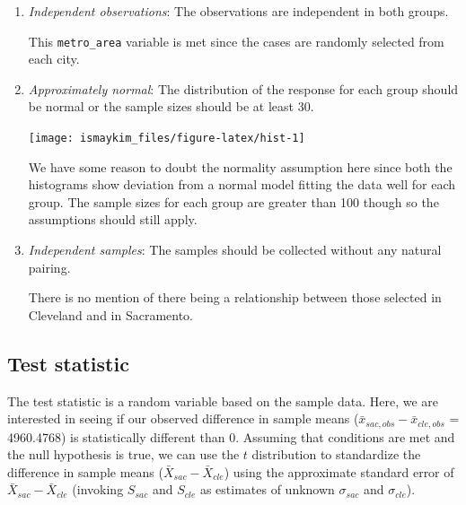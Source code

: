 \documentclass[]{tufte-book}
\newenvironment{Shaded}{\begin{snugshade}}{\end{snugshade}}
\newcommand{\KeywordTok}[1]{\textcolor[rgb]{0.13,0.29,0.53}{\textbf{{#1}}}}
\newcommand{\DataTypeTok}[1]{\textcolor[rgb]{0.13,0.29,0.53}{{#1}}}
\newcommand{\DecValTok}[1]{\textcolor[rgb]{0.00,0.00,0.81}{{#1}}}
\newcommand{\StringTok}[1]{\textcolor[rgb]{0.31,0.60,0.02}{{#1}}}
\newcommand{\NormalTok}[1]{{#1}}
\theoremstyle{definition}
\theoremstyle{definition}
\theoremstyle{remark}
\begin{document}
\begin{enumerate}
\def\labelenumi{\arabic{enumi}.}
\item
  \emph{Independent observations}: The observations are independent in
  both groups.

  This \texttt{metro\_area} variable is met since the cases are randomly
  selected from each city.
\item
  \emph{Approximately normal}: The distribution of the response for each
  group should be normal or the sample sizes should be at least 30.

\begin{Shaded}
\end{Shaded}

  \begin{center}\texttt{[image: ismaykim\_files/figure-latex/hist-1]} \end{center}

  We have some reason to doubt the normality assumption here since both
  the histograms show deviation from a normal model fitting the data
  well for each group. The sample sizes for each group are greater than
  100 though so the assumptions should still apply.
\item
  \emph{Independent samples}: The samples should be collected without
  any natural pairing.

  There is no mention of there being a relationship between those
  selected in Cleveland and in Sacramento.
\end{enumerate}

\subsection{Test statistic}\label{test-statistic-3}

The test statistic is a random variable based on the sample data. Here,
we are interested in seeing if our observed difference in sample means
(\(\bar{x}_{sac, obs} - \bar{x}_{cle, obs}\) = 4960.4768) is
statistically different than 0. Assuming that conditions are met and the
null hypothesis is true, we can use the \(t\) distribution to
standardize the difference in sample means
(\(\bar{X}_{sac} - \bar{X}_{cle}\)) using the approximate standard error
of \(\bar{X}_{sac} - \bar{X}_{cle}\) (invoking \(S_{sac}\) and
\(S_{cle}\) as estimates of unknown \(\sigma_{sac}\) and
\(\sigma_{cle}\)).
\end{document}
